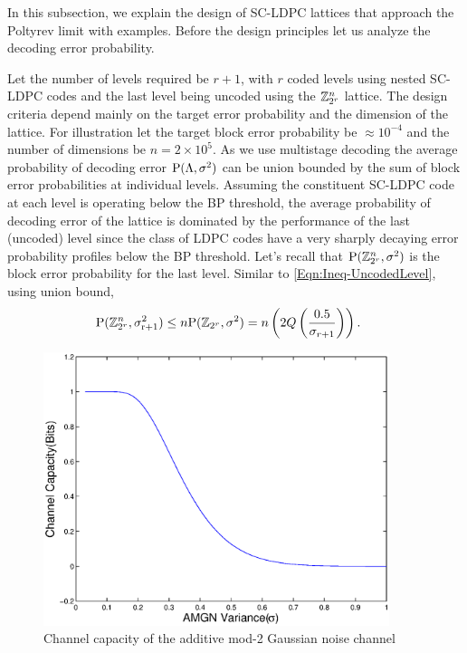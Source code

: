 In this subsection, we explain the design of SC-LDPC lattices that approach the Poltyrev limit with examples. Before the design principles  let us analyze the decoding error probability.

Let the number of levels required be $r+1$, with $r$ coded levels using nested SC-LDPC codes and the last level being uncoded using the $\mathbb{Z}_{2^r}^{n}$ lattice. The design criteria depend mainly on the target error probability and the dimension of the lattice. For illustration let the  target block error probability be $\approx10^{-4}$ and the number of dimensions be $n=2 \times 10^{5}$.
As we use multistage decoding the average probability of decoding error $\text{P}(\Lambda,\sigma^{2})$ can be union bounded by the sum of block error probabilities at individual levels. Assuming the constituent SC-LDPC code at each level is operating below the BP threshold\cite{richardson2008modern}, the average probability of decoding error of the lattice is dominated by the performance of the last (uncoded) level since the class of LDPC codes have a very sharply decaying error probability profiles below the BP threshold. Let's recall that  $\text{P}(\mathbb{Z}_{2^r}^{n},\sigma^{2})$ is the block error probability for the last level. Similar to \eqref{Eqn:Ineq-UncodedLevel}, using union bound,
\begin{align}
\text{P}(\mathbb{Z}_{2^r}^{n},\sigma_{\text{r+1}}^{2})&\leq n\text{P}(\mathbb{Z}_{2^r},\sigma^{2})=n\left(2Q\left(\frac{0.5}{\sigma_{r+1}}\right)	\right).
\label{Eqn:ZLatticeProb}
\end{align}

\begin{figure}[!ht]
\centering
\includegraphics[width=0.9\textwidth]{./figures/SCLDPC_lattices/Cap_integer_coset_lattice.eps}
\caption{Channel capacity of the additive mod-2 Gaussian noise channel}
\label{Fig:AMGNCapacity}
\end{figure}

